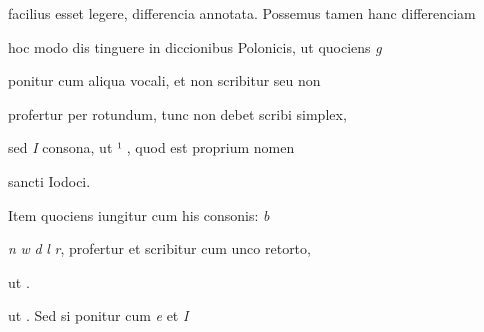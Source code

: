 facilius esset legere, differencia annotata. Possemus tamen hanc differenciam

hoc modo dis tinguere in diccionibus Polonicis, ut quociens \textit{g}

ponitur cum aliqua vocali, et non scribitur seu non

profertur per  rotundum, tunc non debet scribi  simplex,

sed \textit{I} consona, ut ¹  , quod est proprium nomen

\splitlines

sancti Iodoci.

\indentK Item quociens iungitur cum his consonis: \textit{b}

\fulllines

\textit{n} \textit{w} \textit{d} \textit{l} \textit{r}, profertur et scribitur cum unco retorto,


\fullpreviouslines

{
\color{blue}

ut    .

}


\fulllines


ut    . Sed si ponitur cum \textit{e} et \textit{I}


\endinput








«s -yy rfep.; v.





\catcode `\^^M=5

  \newtip{48}{Łoś niesłusznie uważa, że \textit{bika} w obu wypadkach
    napisano błędnie zamiast \textit{ƀyka}. Przykłady są bowiem podane
    w~pisowni dotychczasowej dla pokazania jej niewystarczalności do
    zróżnicowania wyrazów \textit{bika} i \textit{byka}.}

\obeylines






\newcommand{\margin}[1]{\annotatetextBlue{\{#1\}}{zapisy na marginesie}}


